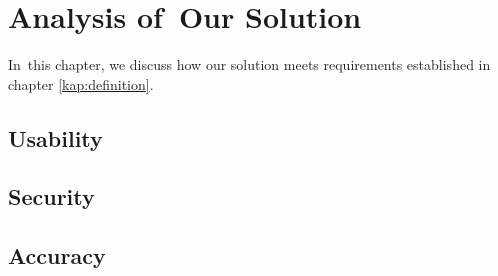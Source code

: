 \chapter{Analysis of~Our Solution}
\label{kap:analysis}

In~this chapter, we discuss how our solution meets requirements established in chapter \ref{kap:definition}.

\section{Usability}
\section{Security}
\section{Accuracy}